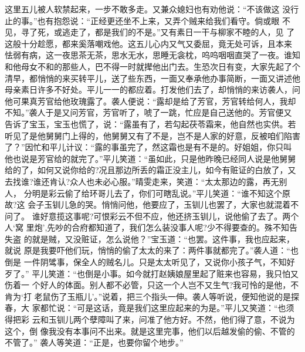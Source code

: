 这里五儿被人软禁起来，一步不敢多走。又兼众媳妇也有劝他说：“不该做这
没行止的事。”也有抱怨说：“正经更还坐不上来，又弄个贼来给我们看守。倘或眼
不见，寻了死，或逃走了，都是我们的不是。”又有素日一干与柳家不睦的人，见
了这般十分趁愿，都来奚落嘲戏他。这五儿心内又气又委屈，竟无处可诉，且本来
怯弱有病，这一夜思茶无茶，思水无水，思睡无衾枕，呜呜咽咽直哭了一夜。谁知
和他母女不和的那些人，巴不得一时就撵他出门去。生恐次日有变，大家先起了个
清早，都悄悄的来买转平儿，送了些东西，一面又奉承他办事简断，一面又讲述他
母亲素日许多不好处。平儿一一的都应着。打发他们去了，却悄悄的来访袭人，问
他可果真芳官给他玫瑰露了。袭人便说：“露却是给了芳官，芳官转给何人，我却
不知。”袭人于是又问芳官，芳官听了，唬了一跳，忙应是自己送他的。芳官便又
告诉了宝玉，宝玉也慌了，说：“露虽有了，若勾起茯苓霜来，他自然也实供。若
听见了是他舅舅门上得的，他舅舅又有了不是，岂不是人家的好意，反被咱们陷害
了？”因忙和平儿计议：“露的事虽完了，然这霜也是有不是的。好姐姐，你只叫
他也说是芳官给的就完了。”平儿笑道：“虽如此，只是他昨晚已经同人说是他舅舅
给的了，如何又说你给的?况且那边所丢的霜正没主儿，如今有赃证的白放了，又
去找谁?谁还肯认?众人也未必心服。”晴雯走来，笑道：“太太那边的露，再无别人，
分明是彩云偷了给环哥儿去了，你们可瞎乱说。”平儿笑道：“谁不知这个原故?这
会子玉钏儿急的哭。悄悄问他，他要应了，玉钏儿也罢了，大家也就混着不问了。
谁好意揽这事呢?可恨彩云不但不应，他还挤玉钏儿，说他偷了去了。两个人‘窝
里炮’,先吵的合府都知道了，我们怎么装没事人呢?少不得要查的。殊不知告失盗
的就是贼，又没赃证，怎么说他？”宝玉道：“也罢。这件事，我也应起来，就说
原是我要吓他们玩，悄悄的偷了太太的来了：两件事就都完了。”袭人道：“也倒是
一件阴骘事，保全人的贼名儿。只是太太听见了，又说你小孩子气，不知好歹了。”
平儿笑道：“也倒是小事。如今就打赵姨娘屋里起了赃来也容易，我只怕又伤着一
个好人的体面。别人都不必管，只这一个人岂不又生气?我可怜的是他，不肯为‘打
老鼠伤了玉瓶儿’。”说着，把三个指头一伸。袭人等听说，便知他说的是探春，大
家都忙说：“可是这话，竟是我们这里应起来的为是。”平儿又笑道：“也须得把彩
云和玉钏儿两个孽障叫了来，问准了他方好。不然，他们得了意，不说为这个，倒
像我没有本事问不出来。就是这里完事，他们以后越发偷的偷、不管的不管了。”
袭人等笑道：“正是，也要你留个地步。”

